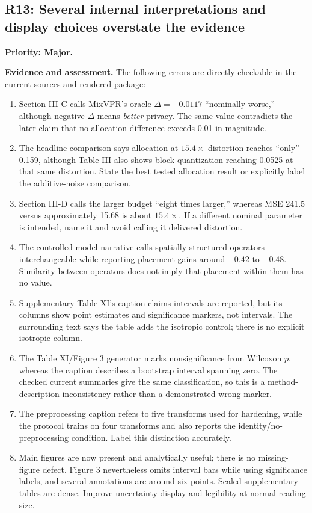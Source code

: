 \documentclass[11pt,a4paper]{article}
\newcommand{\finding}[3]{\subsection{#1: #3}\label{rev:#1}\textbf{Priority: #2.}}
\newcommand{\evidence}{\par\textbf{Evidence and assessment.} }
\begin{document}
\finding{R13}{Major}{Several internal interpretations and display choices overstate the evidence}
\evidence
The following errors are directly checkable in the current sources and rendered package:
\begin{enumerate}
\item Section III-C calls MixVPR's oracle $\Delta=-0.0117$ ``nominally worse,'' although negative $\Delta$ means \emph{better} privacy. The same value contradicts the later claim that no allocation difference exceeds 0.01 in magnitude.
\item The headline comparison says allocation at $15.4\times$ distortion reaches ``only'' 0.159, although Table III also shows block quantization reaching 0.0525 at that same distortion. State the best tested allocation result or explicitly label the additive-noise comparison.
\item Section III-D calls the larger budget ``eight times larger,'' whereas MSE 241.5 versus approximately 15.68 is about $15.4\times$. If a different nominal parameter is intended, name it and avoid calling it delivered distortion.
\item The controlled-model narrative calls spatially structured operators interchangeable while reporting placement gains around $-0.42$ to $-0.48$. Similarity between operators does not imply that placement within them has no value.
\item Supplementary Table XI's caption claims intervals are reported, but its columns show point estimates and significance markers, not intervals. The surrounding text says the table adds the isotropic control; there is no explicit isotropic column.
\item The Table XI/Figure 3 generator marks nonsignificance from Wilcoxon $p$, whereas the caption describes a bootstrap interval spanning zero. The checked current summaries give the same classification, so this is a method-description inconsistency rather than a demonstrated wrong marker.
\item The preprocessing caption refers to five transforms used for hardening, while the protocol trains on four transforms and also reports the identity/no-preprocessing condition. Label this distinction accurately.
\item Main figures are now present and analytically useful; there is no missing-figure defect. Figure 3 nevertheless omits interval bars while using significance labels, and several annotations are around six points. Scaled supplementary tables are dense. Improve uncertainty display and legibility at normal reading size.
\end{enumerate}
\end{document}
